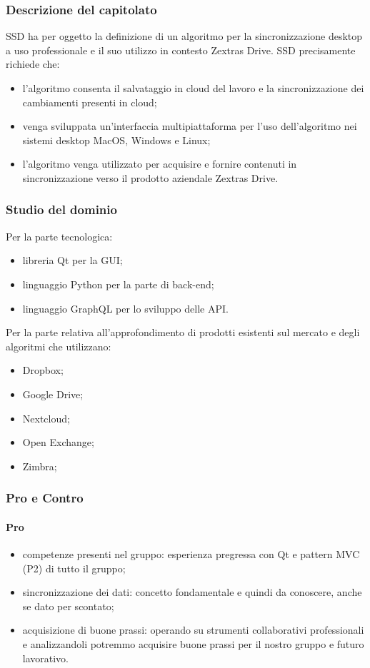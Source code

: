 \subsubsection{Descrizione del capitolato}
SSD ha per oggetto la definizione di un algoritmo per la sincronizzazione desktop a uso professionale e il suo utilizzo in contesto Zextras Drive. SSD precisamente richiede che:
\begin{itemize}
	\item l'algoritmo consenta il salvataggio in cloud del lavoro e la sincronizzazione dei cambiamenti presenti in cloud;
	\item venga sviluppata un'interfaccia multipiattaforma per l'uso dell'algoritmo nei sistemi desktop MacOS, Windows e Linux;
	\item l'algoritmo venga utilizzato per acquisire e fornire contenuti in sincronizzazione verso il prodotto aziendale Zextras Drive.
\end{itemize}
\subsubsection{Studio del dominio}
Per la parte tecnologica:
\begin{itemize}
	\item libreria Qt per la GUI;
	\item linguaggio Python per la parte di back-end;
	\item linguaggio GraphQL per lo sviluppo delle API.
\end{itemize} 

Per la parte relativa all'approfondimento di prodotti esistenti sul mercato e degli algoritmi che utilizzano:
\begin{itemize}
	\item Dropbox;
	\item Google Drive;
	\item Nextcloud;
	\item Open Exchange;
	\item Zimbra;
\end{itemize} 
\subsubsection{Pro e Contro}
\paragraph*{Pro}
\begin{itemize}
	\item competenze presenti nel gruppo: esperienza pregressa con Qt e pattern MVC (P2) di tutto il gruppo;
	\item sincronizzazione dei dati: concetto fondamentale e quindi da conoscere, anche se dato per scontato;
	\item acquisizione di buone prassi: operando su strumenti collaborativi professionali e analizzandoli potremmo acquisire buone prassi per il nostro gruppo e futuro lavorativo.	
\end{itemize}
